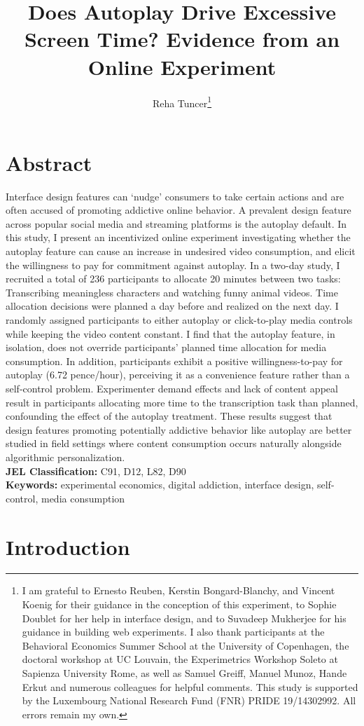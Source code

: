 \documentclass[11pt,a4paper,oneside]{article}
\title{Does Autoplay Drive Excessive Screen Time? Evidence from an Online Experiment
}
\author{Reha Tuncer\footnote{I am grateful to Ernesto Reuben, Kerstin Bongard-Blanchy, and Vincent Koenig for their guidance in the conception of this experiment, to Sophie Doublet for her help in interface design, and to Suvadeep Mukherjee for his guidance in building web experiments. I also thank participants at the Behavioral Economics Summer School at the University of Copenhagen, the doctoral workshop at UC Louvain, the Experimetrics Workshop Soleto at Sapienza University Rome, as well as Samuel Greiff, Manuel Munoz, Hande Erkut and numerous colleagues for helpful comments. This study is supported by the Luxembourg National Research Fund (FNR) PRIDE 19/14302992. All errors remain my own.}}
\begin{document}
\maketitle


\section*{Abstract}

Interface design features can `nudge' consumers to take certain actions and are often accused of promoting addictive online behavior. A prevalent design feature across popular social media and streaming platforms is the autoplay default. In this study, I present an incentivized online experiment investigating whether the autoplay feature can cause an increase in undesired video consumption, and elicit the willingness to pay for commitment against autoplay. In a two-day study, I recruited a total of 236 participants to allocate 20 minutes between two tasks: Transcribing meaningless characters and watching funny animal videos. Time allocation decisions were planned a day before and realized on the next day. I randomly assigned participants to either autoplay or click-to-play media controls while keeping the video content constant. I find that the autoplay feature, in isolation, does not override participants' planned time allocation for media consumption. In addition, participants exhibit a positive willingness-to-pay for autoplay (6.72 pence/hour), perceiving it as a convenience feature rather than a self-control problem. Experimenter demand effects and lack of content appeal result in participants allocating more time to the transcription task than planned, confounding the effect of the autoplay treatment. These results suggest that design features promoting potentially addictive behavior like autoplay are better studied in field settings where content consumption occurs naturally alongside algorithmic personalization.
\medskip \\
\textbf{JEL Classification:} C91, D12, L82, D90 \\
\textbf{Keywords:} experimental economics, digital addiction, interface design, self-control, media consumption

\section{Introduction}
\end{document}
